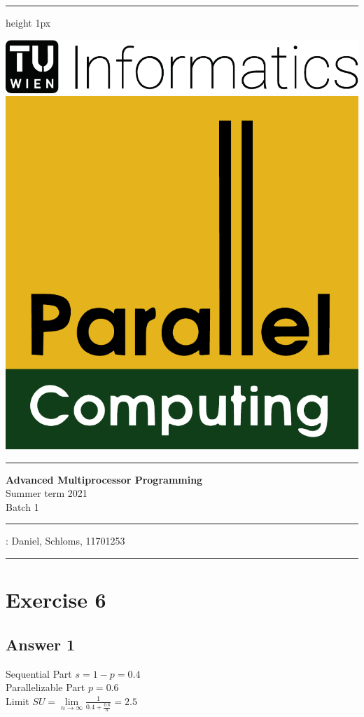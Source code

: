 \documentclass[a4paper,%
11pt,%
DIV=14,
headsepline,%
headings=normal,
]{scrartcl}
\newcommand{\exercise}[1]{\section*{Exercise #1}}
\newcommand{\answer}[1]{\subsection*{Answer #1}}
\begin{document}
\noindent
\hrule height 1px
\vspace*{1ex}
\begin{minipage}[t]{.45\linewidth}
\strut\vspace*{-\baselineskip}\newline
\includegraphics[height=.9cm]{./figs/Inf-Logo_black_en.pdf}
\includegraphics[height=.9cm]{.//figs/par-logo}
\end{minipage}
\hfill
\begin{minipage}[t]{.5\linewidth}
\end{minipage}
\vspace*{1ex}

\hrule 

\vspace*{2ex}

\begin{center}
{\LARGE\textbf{Advanced Multiprocessor Programming}}\\
{\large{}%
  Summer term 2021\\
  Batch 1\\
}
\end{center}

\hrule 
\vspace*{1ex}

: Daniel, Schloms, 11701253\\

\vspace*{1ex}
\hrule 

\exercise{6}

\answer{1}

	Sequential Part $s = 1 - p = 0.4$\\
	Parallelizable Part $p = 0.6$\\
	Limit $SU = \lim \limits_{n \to \infty} \frac{1}{0.4 + \frac{0.6}{n}} = 2.5$
\end{document}

